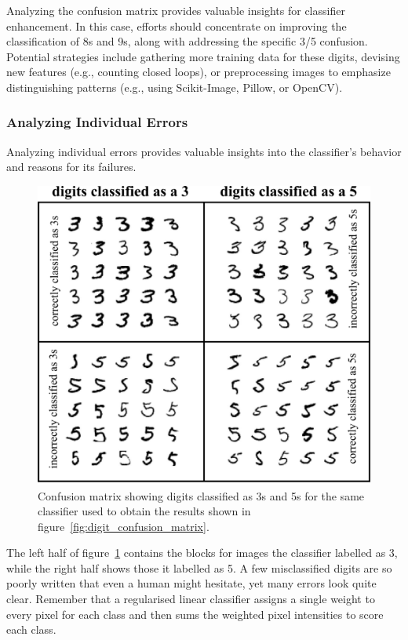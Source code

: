 \documentclass[12pt,letter]{article}
\begin{document}
Analyzing the confusion matrix provides valuable insights for classifier enhancement. In this case, efforts should concentrate on improving the classification of 8s and 9s, along with addressing the specific 3/5 confusion. Potential strategies include gathering more training data for these digits, devising new features (e.g., counting closed loops), or preprocessing images to emphasize distinguishing patterns (e.g., using Scikit-Image, Pillow, or OpenCV).


\pagebreak
\subsubsection{Analyzing Individual Errors}
\vspace{-1ex}

Analyzing individual errors provides valuable insights into the classifier's behavior and reasons for its failures.

\begin{figure}[H]
    \centering
	\vspace{-1ex}
    \includegraphics[]{../figures/3s_and_5s.png}
	\vspace{-1ex}
    \caption{Confusion matrix showing digits classified as 3s and 5s for the same classifier used to obtain the results shown in figure~\ref{fig:digit_confusion_matrix}.}
    \label{fig:3s_and_5s}
\end{figure}

The left half of figure~\ref{fig:3s_and_5s} contains the blocks for images the classifier labelled as 3, while the right half shows those it labelled as 5. A few misclassified digits are so poorly written that even a human might hesitate, yet many errors look quite clear. Remember that a regularised linear classifier assigns a single weight to every pixel for each class and then sums the weighted pixel intensities to score each class. 
\end{document}
